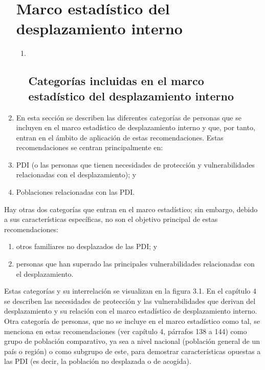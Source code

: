 \documentclass[
]{book}
\providecommand{\tightlist}{%
  \setlength{\itemsep}{0pt}\setlength{\parskip}{0pt}}
\begin{document}
\begin{enumerate}
{  \section{Marco estadístico del desplazamiento interno}\label{marco-estaduxedstico-del-desplazamiento-interno}}

  \begin{enumerate}
  \def\labelenumii{\arabic{enumii}.}
  \item ~
    \hypertarget{categoruxedas-incluidas-en-el-marco-estaduxedstico-del-desplazamiento-interno}{%
    \subsection{Categorías incluidas en el marco estadístico del desplazamiento interno}\label{categoruxedas-incluidas-en-el-marco-estaduxedstico-del-desplazamiento-interno}}
  \end{enumerate}
\item
  En esta sección se describen las diferentes categorías de personas que se incluyen en el marco estadístico de desplazamiento interno y que, por tanto, entran en el ámbito de aplicación de estas recomendaciones. Estas recomendaciones se centran principalmente en:
\item
  PDI (o las personas que tienen necesidades de protección y vulnerabilidades relacionadas con el desplazamiento); y
\item
  Poblaciones relacionadas con las PDI.
\end{enumerate}

Hay otras dos categorías que entran en el marco estadístico; sin embargo, debido a sus características específicas, no son el objetivo principal de estas recomendaciones:

\begin{enumerate}
\def\labelenumi{\arabic{enumi}.}
\tightlist
\item
  otros familiares no desplazados de las PDI; y
\item
  personas que han superado las principales vulnerabilidades relacionadas con el desplazamiento.
\end{enumerate}

Estas categorías y su interrelación se visualizan en la figura 3.1. En el capítulo 4 se describen las necesidades de protección y las vulnerabilidades que derivan del desplazamiento y su relación con el marco estadístico de desplazamiento interno. Otra categoría de personas, que no se incluye en el marco estadístico como tal, se menciona en estas recomendaciones (ver capítulo 4, párrafos 138 a 144) como grupo de población comparativo, ya sea a nivel nacional (población general de un país o región) o como subgrupo de este, para demostrar características opuestas a las PDI (es decir, la población no desplazada o de acogida).
\end{document}
